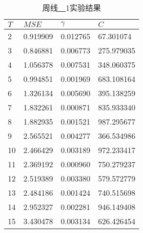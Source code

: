 \begin{table}[ht]
    \centering
    \caption{周线\underline{~~}1实验结果}
    \begin{tabular}{llll}
        \hline
        $T$&     $MSE$ &  $\gamma$ &         $C$ \\
        \hline
         2 &  0.919909 &  0.012765 &   67.301074 \\
         3 &  0.846881 &  0.006773 &  275.979035 \\
         4 &  1.056378 &  0.007531 &  348.060375 \\
         5 &  0.994851 &  0.001969 &  683.108164 \\
         6 &  1.326134 &  0.005690 &  395.138259 \\
         7 &  1.832261 &  0.000871 &  835.933340 \\
         8 &  1.882935 &  0.001521 &  987.295677 \\
         9 &  2.565521 &  0.004277 &  366.534986 \\
        10 &  2.466429 &  0.003189 &  972.233417 \\
        11 &  2.369192 &  0.000960 &  750.279237 \\
        12 &  2.519389 &  0.003380 &  579.572779 \\
        13 &  2.484186 &  0.001424 &  740.515698 \\
        14 &  2.952327 &  0.002281 &  946.149408 \\
        15 &  3.430478 &  0.003134 &  626.426454 \\
        \hline
    \end{tabular}
\end{table}

